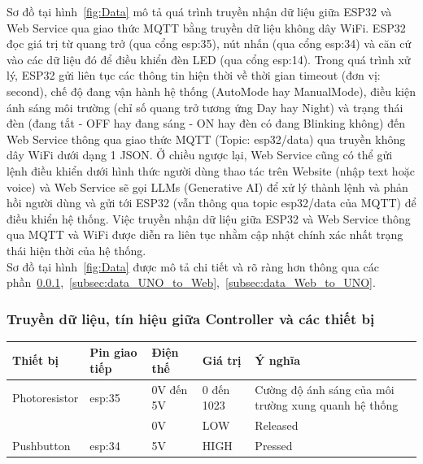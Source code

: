 {Sơ đồ tại hình~\ref{fig:Data} mô tả quá trình truyền nhận dữ liệu giữa ESP32 và Web Service qua giao thức MQTT bằng truyền dữ liệu không dây WiFi. ESP32 đọc giá trị từ quang trở (qua cổng esp:35), nút nhấn (qua cổng esp:34) và căn cứ vào các dữ liệu đó để điều khiển đèn LED (qua cổng esp:14). Trong quá trình xử lý, ESP32 gửi liên tục các thông tin hiện thời về thời gian timeout (đơn vị: second), chế độ đang vận hành hệ thống (AutoMode hay ManualMode), điều kiện ánh sáng môi trường (chỉ số quang trở tương ứng Day hay Night) và trạng thái đèn (đang tắt - OFF hay đang sáng - ON hay đèn có đang Blinking không) đến Web Service thông qua giao thức MQTT (Topic: esp32/data) qua truyền không dây WiFi dưới dạng 1 JSON. Ở chiều ngược lại, Web Service cũng có thể gửi lệnh điều khiển dưới hình thức người dùng thao tác trên Website (nhập text hoặc voice) và Web Service sẽ gọi LLMs (Generative AI) để xử lý thành lệnh và phản hồi người dùng và gửi tới ESP32 (vẫn thông qua topic esp32/data của MQTT) để điều khiển hệ thống. Việc truyền nhận dữ liệu giữa ESP32 và Web Service thông qua MQTT và WiFi được diễn ra liên tục nhằm cập nhật chính xác nhất trạng thái hiện thời của hệ thống. \\

Sơ đồ tại hình~\ref{fig:Data} được mô tả chi tiết và rõ ràng hơn thông qua các phần~\ref{subsec:data_in_UNO},~\ref{subsec:data_UNO_to_Web},~\ref{subsec:data_Web_to_UNO}.

\subsubsection{Truyền dữ liệu, tín hiệu giữa Controller và các thiết bị}\label{subsec:data_in_UNO}
\begin{table}[H]
\centering
\small
\begin{tabular}{|p{2.5cm}|p{2.5cm}|p{2.5cm}|p{2.5cm}|p{4.5cm}|}
\hline
{\textbf{Thiết bị}}            & {\textbf{Pin giao tiếp}} & {\textbf{Điện thế}} & {\textbf{Giá trị}} & {\textbf{Ý nghĩa}}                                 \\ \hline
{Photoresistor}                & {esp:35}                     & {0V đến 5V}         & {0 đến 1023}       & {Cường độ ánh sáng của môi trường xung quanh hệ thống} \\ \hline
{}                             & {}                       & {0V}                & {LOW}              & {Released}                                         \\ \cline{3-5} 
\multirow{-2}{*}{{Pushbutton}} & \multirow{-2}{*}{{esp:34}}   & {5V}                & {HIGH}             & {Pressed}                                          \\ \hline


\end{tabular}
\end{table}}
